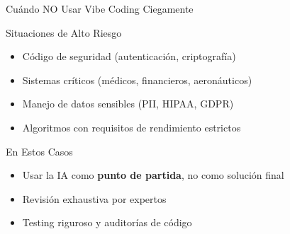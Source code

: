 \documentclass[aspectratio=169]{beamer}
\begin{document}
\begin{frame}{Cuándo NO Usar Vibe Coding Ciegamente}
    \begin{alertblock}{Situaciones de Alto Riesgo}
        \begin{itemize}
            \item Código de seguridad (autenticación, criptografía)
            \item Sistemas críticos (médicos, financieros, aeronáuticos)
            \item Manejo de datos sensibles (PII, HIPAA, GDPR)
            \item Algoritmos con requisitos de rendimiento estrictos
        \end{itemize}
    \end{alertblock}
    
    \vspace{0.3cm}
    \begin{exampleblock}{En Estos Casos}
        \begin{itemize}
            \item Usar la IA como \textbf{punto de partida}, no como solución final
            \item Revisión exhaustiva por expertos
            \item Testing riguroso y auditorías de código
        \end{itemize}
    \end{exampleblock}
\end{frame}
\end{document}
